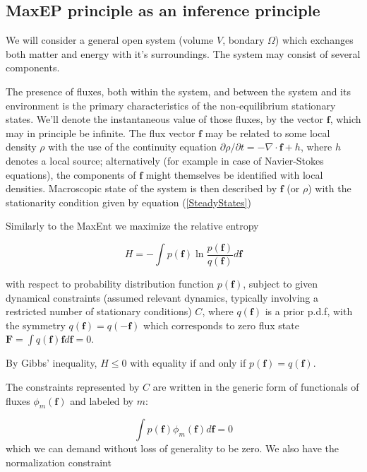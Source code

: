 \documentclass[a4paper,12pt]{article}
\begin{document}
\subsection{MaxEP principle as an inference principle}

We will consider a general open system (volume $V$, bondary $\Omega$) which exchanges both matter and energy with it's surroundings. The system may consist of several components.

The presence of fluxes, both within the system, and between the system and its environment is the primary characteristics of the non-equilibrium stationary states. We'll denote the instantaneous value of those fluxes, by the vector $\bm{f}$, which may in principle be infinite. The flux vector $\bm{f}$ may be related to some local density $\rho$ with the use of the continuity equation $\partial \rho / \partial t =  - \nabla \cdot \bm{f} + h$, where $h$ denotes a local source; alternatively (for example in case of Navier-Stokes equations), the components of $\bm{f}$ might themselves be identified with local densities. Macroscopic state of the system is then described by $\bm{f}$ (or $\rho$) with the stationarity condition given by equation (\ref{SteadyStates})

Similarly to the MaxEnt we maximize the relative entropy

\begin{equation}
  H = - \int p(\bm{f})\ln \frac{p(\bm{f})}{q(\bm{f})} d\bm{f}
\end{equation}

with respect to probability distribution function $p(\bm{f})$, subject to given dynamical constraints (assumed relevant dynamics, typically involving a restricted number of stationary conditions) $C$, where $q(\bm{f})$ is a prior p.d.f, with the symmetry $q(\bm{f}) =q(\bm{-f})$ which corresponds to zero flux state $\bm{F}= \int q(\bm{f}) \bm{f} d\bm{f}=0 $.

By Gibbs' inequality, $H \leq 0$ with equality if and only if $p(\bm{f})=q(\bm{f})$.


The constraints represented by $C$ are written in the generic form of functionals of fluxes $\phi_m(\bm{f})$ and labeled by $m$:

\begin{equation}
\label{Constrain1MEP}
  \int p(\bm{f})\phi_m(\bm{f})d\bm{f} =0
\end{equation}
which we can demand without loss of generality to be zero.
We also have the normalization constraint
\end{document}
